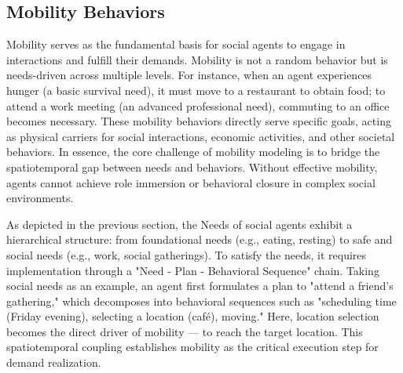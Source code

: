\subsection{Mobility Behaviors}\label{sec:mobility}
Mobility serves as the fundamental basis for social agents to engage in interactions and fulfill their demands. Mobility is not a random behavior but is needs-driven across multiple levels. For instance, when an agent experiences hunger (a basic survival need), it must move to a restaurant to obtain food; to attend a work meeting (an advanced professional need), commuting to an office becomes necessary. These mobility behaviors directly serve specific goals, acting as physical carriers for social interactions, economic activities, and other societal behaviors. In essence, the core challenge of mobility modeling is to bridge the spatiotemporal gap between needs and behaviors. Without effective mobility, agents cannot achieve role immersion or behavioral closure in complex social environments.

As depicted in the previous section, the Needs of social agents exhibit a hierarchical structure: from foundational needs (e.g., eating, resting) to safe and social needs (e.g., work, social gatherings). To satisfy the needs, it requires implementation through a "Need - Plan - Behavioral Sequence" chain. Taking social needs as an example, an agent first formulates a plan to "attend a friend’s gathering," which decomposes into behavioral sequences such as "scheduling time (Friday evening), selecting a location (café), moving." Here, location selection becomes the direct driver of mobility — to reach the target location. This spatiotemporal coupling establishes mobility as the critical execution step for demand realization.

